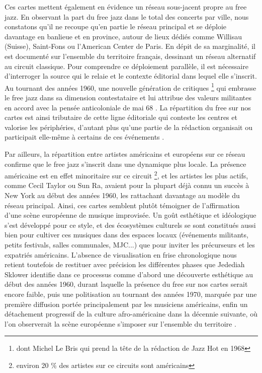 \documentclass[fra, final]{anthology-ch}      %
\begin{document}
    Ces cartes mettent également en évidence un réseau sous-jacent propre au free jazz. En observant la part du free jazz dans le total des concerts par ville, nous constatons qu'il ne recoupe qu'en partie le réseau principal et se déploie davantage en banlieue et en province, autour de lieux dédiés comme Willisau (Suisse), Saint-Fons ou l'American Center de Paris. En dépit de sa marginalité, il est documenté sur l'ensemble du territoire français, dessinant un réseau alternatif au circuit classique. Pour comprendre ce déploiement parallèle, il est nécessaire d'interroger la source qui le relaie et le contexte éditorial dans lequel elle s'inscrit. Au tournant des années 1960, une nouvelle génération de critiques \footnote{dont Michel Le Bris qui prend la tête de la rédaction de Jazz Hot en 1968} qui embrasse le free jazz dans sa dimension contestataire et lui attribue des valeurs militantes  en accord avec la pensée anticoloniale de mai 68 \cite{drott_free_2008}. La répartition du free sur nos cartes est ainsi tributaire de cette ligne éditoriale qui conteste les centres et valorise les périphéries, d'autant plus qu'une partie de la rédaction organisait ou participait elle-même à certains de ces événements \cite{roueff_espace_2019}.
    
    Par ailleurs, la répartition entre artistes américains et européens sur ce réseau confirme que le free jazz s'inscrit dans une dynamique plus locale. La présence américaine est en effet minoritaire sur ce circuit \footnote{ environ 20 \% des artistes sur ce circuits sont américains}, et les artistes les plus actifs, comme Cecil Taylor ou Sun Ra, avaient pour la plupart déjà connu un succès à New York au début des années 1960, les rattachant davantage au modèle du réseau principal. Ainsi, ces cartes semblent plutôt témoigner de l'affirmation d'une scène européenne de musique improvisée. Un goût esthétique et idéologique s'est développé pour ce style, et des écosystèmes culturels se sont constitués aussi bien pour cultiver ces musiques dans des espaces locaux (événements militants, petits festivals, salles communales, MJC...) que pour inviter les précurseurs et les expatriés américains. L'absence de visualisation en frise chronologique nous retient toutefois de restituer avec précision les différentes phases que Jedediah Sklower identifie dans ce processus comme d'abord une découverte esthétique au début des années 1960, durant laquelle la présence du free sur nos cartes serait encore faible, puis une politisation au tournant des années 1970, marquée par une première diffusion portée principalement par les musiciens américains, enfin un détachement progressif de la culture afro-américaine dans la décennie suivante, où l'on observerait la scène européenne s'imposer sur l'ensemble du territoire \cite{sklower_free_2006}.
\end{document}
